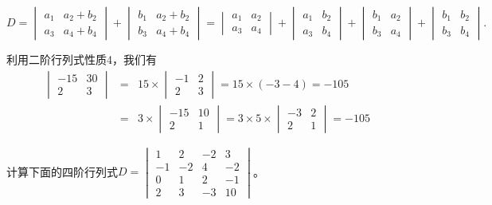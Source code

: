 \begin{solution}
$$D = \begin{vmatrix}
a_1 & a_2 + b_2 \\ a_3 & a_4 + b_4 \end{vmatrix} + \begin{vmatrix}
b_1 & a_2 + b_2 \\ b_3 & a_4 + b_4 \end{vmatrix} = \begin{vmatrix}
a_1 & a_2 \\ a_3 & a_4 \end{vmatrix} + \begin{vmatrix}
a_1 & b_2 \\ a_3 & b_4 \end{vmatrix} + \begin{vmatrix}
b_1 & a_2 \\ b_3 & a_4 \end{vmatrix} + \begin{vmatrix}
b_1 & b_2 \\ b_3 & b_4 \end{vmatrix}.$$
\end{solution}

\begin{eg} 利用二阶行列式性质4，我们有
\begin{eqnarray*}
\begin{vmatrix} -15 & 30 \\ 2 & 3 \end{vmatrix} & = & 15 \times \begin{vmatrix} -1 & 2 \\ 2 & 3 \end{vmatrix} = 15 \times (-3-4) = -105 \\
& = & 3 \times \begin{vmatrix} -15 & 10 \\ 2 & 1 \end{vmatrix} = 3 \times 5 \times \begin{vmatrix} -3 & 2 \\ 2 & 1 \end{vmatrix} = -105
\end{eqnarray*}
\end{eg}

\begin{eg}
计算下面的四阶行列式$D = \begin{vmatrix} 1 & 2 & -2 & 3 \\ -1 & -2 & 4 & -2 \\ 0 & 1 & 2 & -1 \\ 2 & 3 & -3 & 10 \end{vmatrix}$。
\end{eg}

